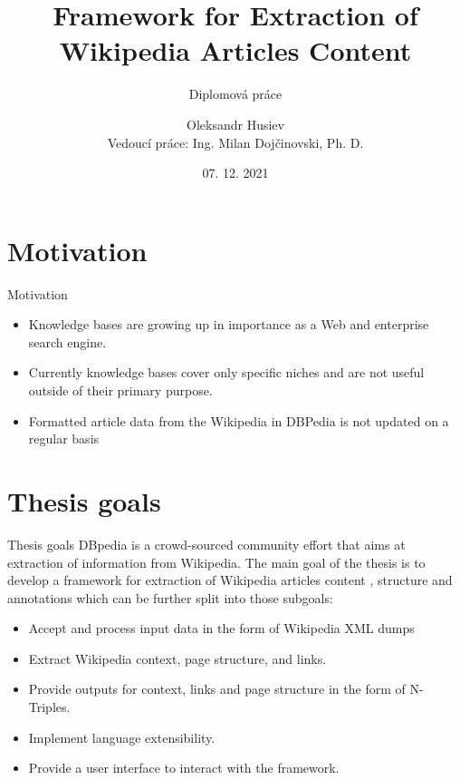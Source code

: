 \documentclass[czech,aspectratio=169]{beamer}
\title[Framework for Extraction of Wikipedia Articles Content]{Framework for Extraction of Wikipedia Articles Content}
\subtitle{Diplomová práce}
\institute[FIT ČVUT v Praze]{Fakulta informačních technologií \\ České vysoké učení technické v Praze}
\author[Oleksandr Husiev]{Oleksandr Husiev \\ Vedoucí práce: Ing. Milan Doj{\v c}inovski, Ph. D.}
\date{07. 12. 2021}
\begin{document}
    \begin{frame}
        \titlepage
    \end{frame}
    
    \begin{frame}
        \tableofcontents
    \end{frame}
  
    
    \section{Motivation}
    \begin{frame}{Motivation}
        \begin{itemize}
            \item Knowledge bases are growing up in importance as a Web and enterprise search engine.
            \item Currently knowledge bases cover only specific niches and are
            not useful outside of their primary purpose.
            \item Formatted article data from the Wikipedia in DBPedia is not updated on a regular basis
        \end{itemize}
    \end{frame}

 \section{Thesis goals}

\begin{frame}{Thesis goals}
DBpedia is a crowd-sourced community effort that aims at extraction of information from Wikipedia. 
The main goal of the thesis is to develop a framework for extraction of Wikipedia articles content
, structure and annotations which can be further split into those subgoals:
	
	\begin{itemize}
		\item Accept and process input data in the form of Wikipedia XML dumps
		\item Extract Wikipedia context, page structure, and links.
		\item Provide outputs for context, links and page structure in the form of N-Triples.
		\item Implement language extensibility.
		\item Provide a user interface to interact with the framework.
	\end{itemize}
\end{frame}
    
\end{document}
